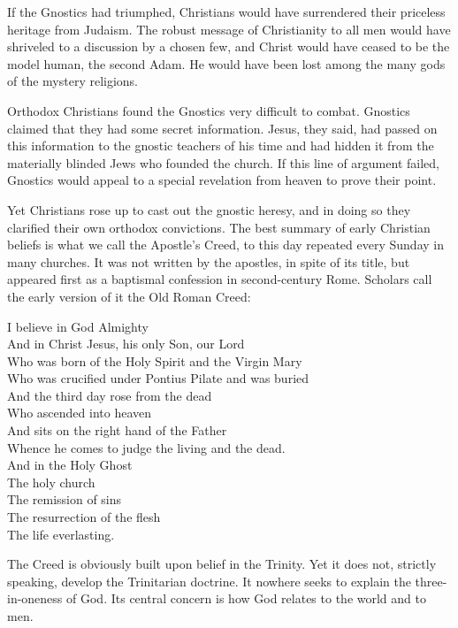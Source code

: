 If the Gnostics had triumphed, Christians would have surrendered their priceless heritage from
Judaism. The robust message of Christianity to all men would have shriveled to a discussion by a
chosen few, and Christ would have ceased to be the model human, the second Adam. He would have been
lost among the many gods of the mystery religions.

Orthodox Christians found the Gnostics very difficult to combat. Gnostics claimed that they had some
secret information. Jesus, they said, had passed on this information to the gnostic teachers of his
time and had hidden it from the materially blinded Jews who founded the church. If this line of
argument failed, Gnostics would appeal to a special revelation from heaven to prove their point.

Yet Christians rose up to cast out the gnostic heresy, and in doing so they clarified their own
orthodox convictions. The best summary of early Christian beliefs is what we call the Apostle’s
Creed, to this day repeated every Sunday in many churches. It was not written by the apostles, in
spite of its title, but appeared first as a baptismal confession in second-century Rome. Scholars
call the early version of it the Old Roman Creed:

\begin{poem}
I believe in God Almighty\\
And in Christ Jesus, his only Son, our Lord\\
Who was born of the Holy Spirit and the Virgin Mary\\
Who was crucified under Pontius Pilate and was buried\\
And the third day rose from the dead\\
Who ascended into heaven\\
And sits on the right hand of the Father\\
Whence he comes to judge the living and the dead.\\
And in the Holy Ghost\\
The holy church\\
The remission of sins\\
The resurrection of the flesh\\
The life everlasting.
\end{poem}


The Creed is obviously built upon belief in the Trinity. Yet it does not, strictly speaking, develop
the Trinitarian doctrine. It nowhere seeks to explain the three-in-oneness of God. Its central
concern is how God relates to the world and to men.

